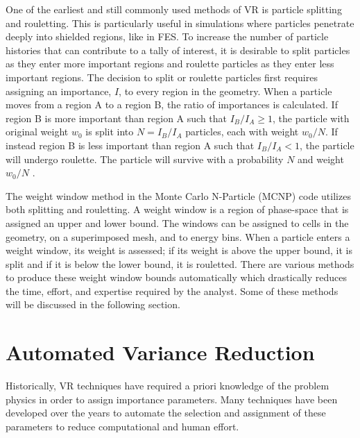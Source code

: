 One of the earliest and still commonly used methods of VR is particle splitting
and rouletting.  This is particularly useful in simulations where particles
penetrate deeply into shielded regions, like in FES.
To increase the number of particle histories that can contribute to a tally of
interest, it is desirable to split particles as they enter more important 
regions and roulette particles as they enter less important regions. 
The decision to split or roulette particles first requires assigning an 
importance, $I$, to every region in the geometry. 
When a particle moves from a region A to a region B,
the ratio of importances is calculated.  If region B is more important than
region A such that 
$I_{B}/I_{A} \geqslant 1$, 
the particle with original weight $w_{0}$ is split into 
$N = I_{B}/I_{A}$
particles, each with weight $w_{0}/N$.  If instead region B is less important
than region A such that
$I_{B}/I_{A} < 1$, 
the particle will undergo roulette. 
The particle will survive with a probability $N$ and weight $w_{0}/N$
\cite{Carter_Cashwell_1975}.

The weight window method in the Monte Carlo N-Particle (MCNP) code utilizes both
splitting and rouletting.  A weight window is a region of phase-space that is 
assigned an upper and lower bound.  The windows can be assigned to cells in the
geometry, on a superimposed mesh, and to energy bins.  When a particle enters
a weight window, its weight is assessed; if its weight is above the upper bound,
it is split and if it is below the lower bound, it is rouletted.  There are various
methods to produce these weight window bounds automatically which drastically reduces the
time, effort, and expertise required by the analyst.  Some of these methods will 
be discussed in the following section.


\section{Automated Variance Reduction}\label{sec:auto_vr}

Historically, VR techniques have required a priori knowledge of the problem physics
in order to assign importance parameters.
Many techniques have been developed over the years to automate the selection and
assignment of these parameters to reduce computational and human effort.

